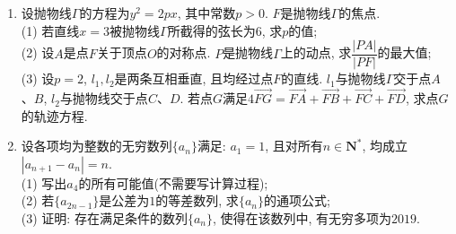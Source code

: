 \documentclass[10pt,a4paper]{article}
\begin{document}
\begin{enumerate}[1.]
\item 设抛物线$\Gamma$的方程为$y^2=2px$, 其中常数$p>0$. $F$是抛物线$\Gamma$的焦点.\\
(1) 若直线$x=3$被抛物线$\Gamma$所截得的弦长为$6$, 求$p$的值;\\
(2) 设$A$是点$F$关于顶点$O$的对称点. $P$是抛物线$\Gamma$上的动点, 求$\dfrac{|PA|}{|PF|}$的最大值;\\
(3) 设$p=2$, $l_1,l_2$是两条互相垂直, 且均经过点$F$的直线. $l_1$与抛物线$\Gamma$交于点$A$、$B$, $l_2$与抛物线交于点$C$、$D$. 若点$G$满足$4\overrightarrow{FG}=\overrightarrow{FA}+\overrightarrow{FB}+\overrightarrow{FC}+\overrightarrow{FD}$, 求点$G$的轨迹方程.
\item 设各项均为整数的无穷数列$\{a_n\}$满足: $a_1=1$, 且对所有$n\in \mathbf{N}^*$, 均成立$|a_{n+1}-a_n|=n$.\\
(1) 写出$a_4$的所有可能值(不需要写计算过程);\\
(2) 若$\{a_{2n-1}\}$是公差为$1$的等差数列, 求$\{{a_n}\}$的通项公式;\\
(3) 证明: 存在满足条件的数列$\{a_n\}$, 使得在该数列中, 有无穷多项为$2019$.






\end{enumerate}
\end{document}

